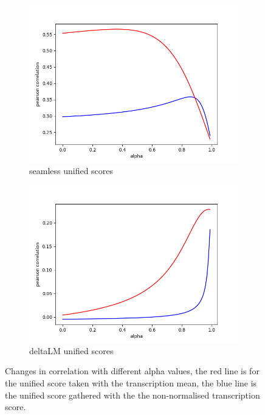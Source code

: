 \begin{figure}[h]
    \centering
    \begin{subfigure}{0.4\linewidth}
        \includegraphics[width=\linewidth]{Latex/sections/images/seamlessuniscoredistribution.png}
        \caption{seamless unified scores}
    \end{subfigure}
    \begin{subfigure}{0.4\linewidth}
        \includegraphics[width=\linewidth]{Latex/sections/images/dlmuniscoredistribution.png}
        \caption{deltaLM unified scores}
    \end{subfigure}
    
    \caption{Changes in correlation with different alpha values, the red line is for the unified score taken with the transcription mean, the blue line is the unified score gathered with the the non-normalised transcription score. }
    \label{fig:uniscore correlation}
\end{figure}

